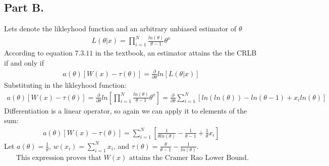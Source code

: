 \documentclass{article}
\begin{document}
\subsection*{Part B.}
Lets denote the likleyhood function and an arbitrary unbiased estimator of $\theta$
\begin{align*}
L(\theta|x) = \prod_{i=1}^{N} \frac{ln(\theta)}{\theta-1} \theta^x
\end{align*}
According to equation $7.3.11$ in the textbook, an estimator attains the the CRLB if and only if
\begin{align*}
a(\theta)[W(x) - \tau(\theta)] = \frac{\partial}{\partial \theta} ln[L(\theta|x)]
\end{align*}
Substituting in the likleyhood function:
\begin{align*}
a(\theta)[W(x) - \tau(\theta)] = \frac{\partial}{\partial \theta} ln[\prod_{i=1}^{N} \frac{ln(\theta)}{\theta-1} \theta^x] = \frac{\partial}{\partial \theta} \sum_{i=1}^{N} [ln(ln(\theta)) - ln(\theta-1) +x_i ln(\theta)]
\end{align*}
Differentiation is a linear operator, so again we can apply it to elements of the sum:
\begin{align*}
a(\theta)[W(x) - \tau(\theta)] = \sum_{i=1}^{N} [\frac{1}{\theta ln(\theta)} - \frac{1}{\theta-1} +\frac{1}{\theta} x_i]
\end{align*}
Let $a(\theta) = \frac{1}{\theta}$, $w(x_i)=\sum_{i=1}^{N}x_i$, and $\tau(\theta) = \frac{\theta}{\theta-1}-\frac{1}{ln(\theta)}$. 
\begin{align*}
\boxed{ \text{ This expression proves that }W(x)\text{ attains the Cramer Rao Lower Bound.} }
\end{align*}
\clearpage
\end{document}
